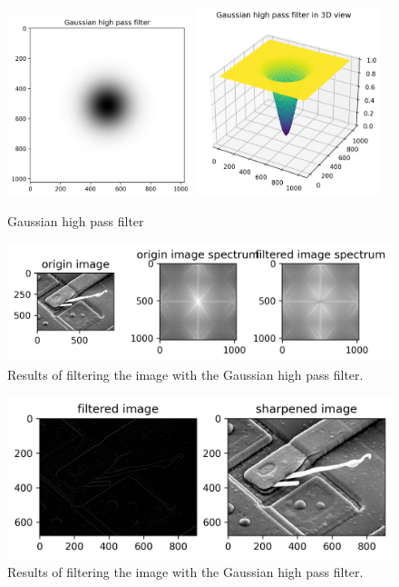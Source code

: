 \begin{figure}[htbp]
    \centering
	\includegraphics[width=0.48\textwidth]{../images/p1/p1b_Gaussian.png}
	\includegraphics[width=0.48\textwidth]{../images/p1/p1b_Gaussian_3D.png}
    \caption{Gaussian high pass filter}
    \label{fig:p1b_Gaussian}
\end{figure}

\begin{figure}[htbp]
    \centering
	\includegraphics[width=\textwidth]{../images/p1/p1b_spectrum.png}
    \caption{Results of filtering the image with the Gaussian high pass filter.}
    \label{fig:p1b_spectrum}
\end{figure}

\begin{figure}[htbp]
    \centering
	\includegraphics[width=\textwidth]{../images/p1/p1b_result.png}
    \caption{Results of filtering the image with the Gaussian high pass filter.}
    \label{fig:p1b_result}
\end{figure}

\newpage